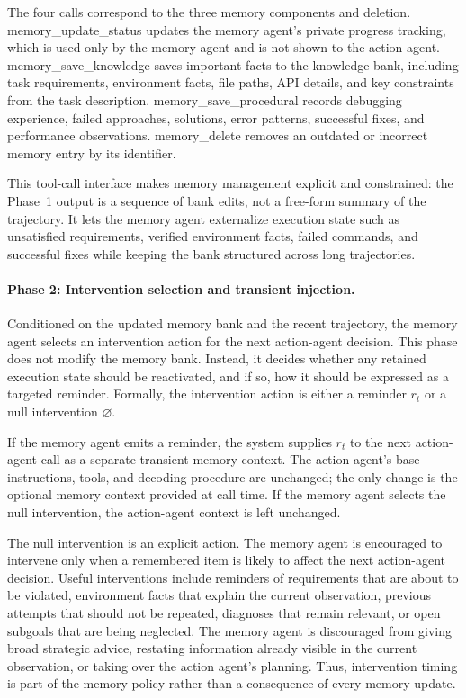 The four calls correspond to the three memory components and deletion.
memory\_update\_status updates the memory agent's private progress tracking,
which is used only by the memory agent and is not shown to the action agent.
memory\_save\_knowledge saves important facts to the knowledge bank, including
task requirements, environment facts, file paths, API details, and key
constraints from the task description. memory\_save\_procedural records
debugging experience, failed approaches, solutions, error patterns, successful
fixes, and performance observations. memory\_delete removes an outdated or
incorrect memory entry by its identifier.

This tool-call interface makes memory management explicit and constrained: the
Phase~1 output is a sequence of bank edits, not a free-form summary of the
trajectory. It lets the memory agent externalize execution state such as
unsatisfied requirements, verified environment facts, failed commands, and
successful fixes while keeping the bank structured across long trajectories.

\paragraph{Phase 2: Intervention selection and transient injection.}
Conditioned on the updated memory bank and the recent trajectory, the memory
agent selects an intervention action for the next action-agent decision. This
phase does not modify the memory bank. Instead, it decides whether any retained
execution state should be reactivated, and if so, how it should be expressed as
a targeted reminder. Formally, the intervention action is either a reminder
$r_t$ or a null intervention $\varnothing$.

If the memory agent emits a reminder, the system supplies $r_t$ to the next
action-agent call as a separate transient memory context. The action agent's
base instructions, tools, and decoding procedure are unchanged; the only change
is the optional memory context provided at call time. If the memory agent selects
the null intervention, the action-agent context is left unchanged.

The null intervention is an explicit action. The memory agent is encouraged to
intervene only when a remembered item is likely to affect the next action-agent
decision. Useful interventions include reminders of requirements that are about
to be violated, environment facts that explain the current observation, previous
attempts that should not be repeated, diagnoses that remain relevant, or open
subgoals that are being neglected. The memory agent is discouraged from giving
broad strategic advice, restating information already visible in the current
observation, or taking over the action agent's planning. Thus, intervention
timing is part of the memory policy rather than a consequence of every memory
update.

